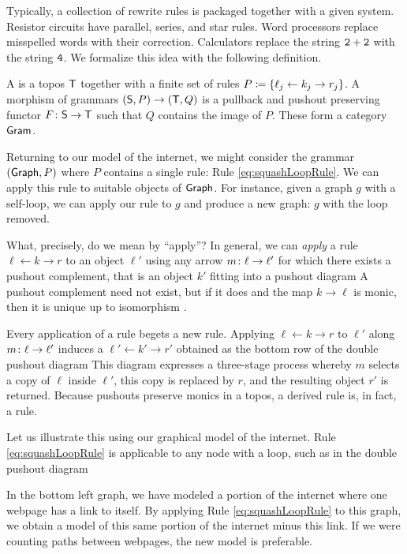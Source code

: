 \documentclass[oneside]{amsart}
\begin{document}
Typically, a collection of rewrite rules is packaged
together with a given system. Resistor circuits have
parallel, series, and star rules. Word processors replace
misspelled words with their correction. Calculators replace
the string $\mathtt{2+2}$ with the string $ \mathtt{4} $. We
formalize this idea with the following definition.

\begin{definition}[Grammar] \label{def:grammar} A
   is a topos $ \mathsf{T} $ together with a
  finite set of rules
  $ P \coloneqq \{ \ell_j \leftarrow k_j \to r_j \} $. A
  morphism of grammars
  $ ( \mathsf{S} , P ) \to ( \mathsf{T} , Q ) $ is a pullback
  and pushout preserving functor
  $ F \colon \mathsf{S} \to \mathsf{T} $ such that $ Q $
  contains the image of $ P $. These form a
  category $ \mathsf{Gram} $.
\end{definition}

Returning to our model of the internet, we might consider the
grammar $ ( \mathsf{Graph}, P ) $ where $ P $ contains a single
rule: Rule \eqref{eq:squashLoopRule}. We can apply this rule
to suitable objects of $ \mathsf{Graph} $.  For instance, given a
graph $g$ with a self-loop, we can apply our rule to $ g $
and produce a new graph: $ g $ with the loop removed.

What, precisely, do we mean by ``apply''?
In general, we can \emph{apply} a rule
$ \ell \gets k \to r $ to an object $ \ell' $
using any arrow $ m \colon \ell \to \ell' $ for
which there exists a pushout complement, that is
an object $ k' $ fitting into a pushout diagram
 A pushout
complement need not exist, but if it does and the
map $ k \to \ell $ is monic, then it is unique up to isomorphism
\parencite[Lem.~15]{LackSobo_Adhesive}.

Every application of a rule begets a new rule. Applying
$ \ell \gets k \to r $ to $\ell'$ along
$ m \colon \ell \to \ell' $ induces a 
$ \ell' \gets k' \to r' $ obtained as the bottom row of the
double pushout diagram  This diagram expresses a three-stage process whereby
$ m $ selects a copy of $ \ell $ inside $ \ell' $, this copy
is replaced by $ r $, and the resulting object $ r' $ is
returned.  Because pushouts preserve monics in a topos, a
derived rule is, in fact, a rule.

Let us illustrate this using our graphical model
of the internet.  Rule \eqref{eq:squashLoopRule}
is applicable to any node with a loop, such as in
the double pushout diagram

In the bottom left graph, we have modeled a
portion of the internet where one webpage has a
link to itself.  By applying Rule
\eqref{eq:squashLoopRule} to this graph, we obtain
a model of this same portion of the internet minus
this link. If we were counting paths between
webpages, the new model is preferable.  
\end{document}
